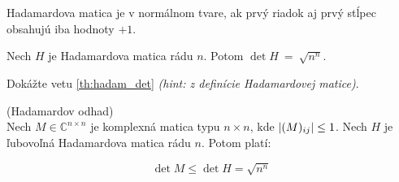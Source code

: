 \begin{definition}
Hadamardova matica je v normálnom tvare, ak prvý riadok aj prvý stĺpec obsahujú iba hodnoty $+1$.
\end{definition}

\begin{theorem}
\label{th:hadam_det}
Nech $H$ je Hadamardova matica rádu $n$. Potom $\det{H}~=~\sqrt{n^n}$.

\end{theorem}
\begin{toreview}
\begin{exercise}
Dokážte vetu \ref{th:hadam_det} \emph{(hint: z definície Hadamardovej matice)}.
\end{exercise}

\end{toreview}

\begin{theorem_hard}{(Hadamardov odhad)}\\
Nech $M \in \mathbb{C}^{n\times n}$ je komplexná matica typu $n\times n$, kde $\left|(M)_{ij}\right| \leq 1$. 
Nech $H$ je ľubovoľná Hadamardova matica rádu $n$.
Potom platí:

$$\det{M} \leq \det{H} = \sqrt{n^n}$$

\end{theorem_hard}

